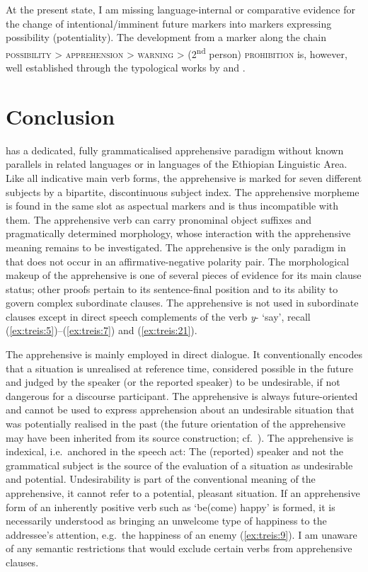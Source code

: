 \documentclass[output=paper,colorlinks,citecolor=brown,]{langscibook}
\begin{document}
\largerpage
At the present state, I am missing language-internal or comparative evidence for the change of intentional\slash imminent future markers into markers expressing possibility (potentiality). The development from a marker along the chain \textsc{possibility > apprehension > warning} > (2\textsuperscript{nd} person) \textsc{prohibition} is, however, well established through the typological works by \citet{Dobrushina2006} and \citet{pakendorfschalley2007}.




\section{Conclusion}\label{sec:treis:6}

 has a dedicated, fully grammaticalised apprehensive paradigm without known parallels in related languages or in languages of the Ethiopian Linguistic Area. Like all  indicative main verb forms, the apprehensive is marked for seven different subjects by a bipartite, discontinuous subject index. The apprehensive morpheme is found in the same slot as aspectual markers and is thus incompatible with them. The apprehensive verb can carry pronominal object suffixes and pragmatically determined morphology, whose interaction with the apprehensive meaning remains to be investigated. The apprehensive is the only paradigm in  that does not occur in an affirmative-negative polarity pair. The morphological makeup of the apprehensive is one of several pieces of evidence for its main clause status; other proofs pertain to its sentence-final position and to its ability to govern complex subordinate clauses. The apprehensive is not used in subordinate clauses except in direct speech complements of the verb \textit{y}- `say', recall (\ref{ex:treis:5})--(\ref{ex:treis:7}) and (\ref{ex:treis:21}).

The apprehensive is mainly employed in direct dialogue. It conventionally encodes that a situation is unrealised at reference time, considered possible in the future and judged by the speaker (or the reported speaker) to be undesirable, if not dangerous for a discourse participant. The  apprehensive is always future-oriented and cannot be used to express apprehension about an undesirable situation that was potentially realised in the past (the future orientation of the apprehensive may have been inherited from its source construction; cf.\   ). The  apprehensive is indexical,  i.e.\ anchored in the speech act: The (reported) speaker and not the grammatical subject is the source of the evaluation of a situation as undesirable and potential. Undesirability is part of the conventional meaning of the  apprehensive, it cannot refer to a potential, pleasant situation. If an apprehensive form of an inherently positive verb such as `be(come) happy' is formed, it is necessarily understood as bringing an unwelcome type of happiness to the addressee's attention,  e.g.\ the happiness of an enemy (\ref{ex:treis:9}). I am unaware of any semantic restrictions that would exclude certain verbs from apprehensive clauses.
\end{document}
